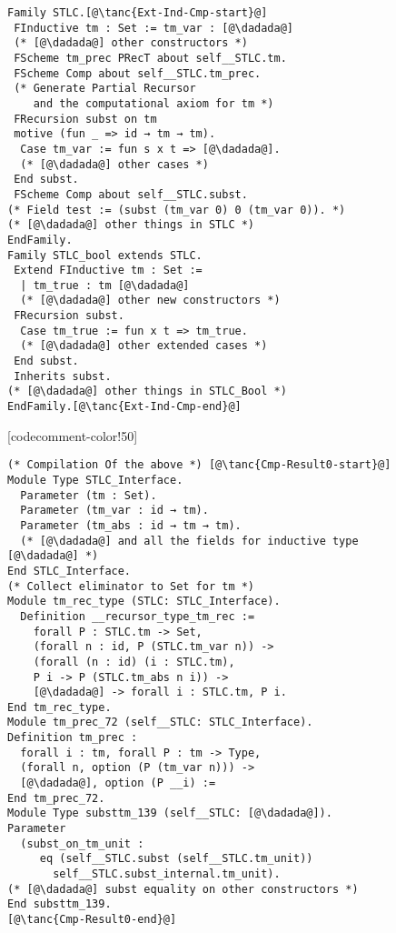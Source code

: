 \begin{figure}

\begin{minipage}{\textwidth}
\begin{multicols}{2}


\begin{lstlisting}
Family STLC.[@\tanc{Ext-Ind-Cmp-start}@]
 FInductive tm : Set := tm_var : [@\dadada@]
 (* [@\dadada@] other constructors *) 
 FScheme tm_prec PRecT about self__STLC.tm.
 FScheme Comp about self__STLC.tm_prec.
 (* Generate Partial Recursor 
    and the computational axiom for tm *)
 FRecursion subst on tm 
 motive (fun _ => id → tm → tm). 
  Case tm_var := fun s x t => [@\dadada@].
  (* [@\dadada@] other cases *)
 End subst.
 FScheme Comp about self__STLC.subst.
(* Field test := (subst (tm_var 0) 0 (tm_var 0)). *)
(* [@\dadada@] other things in STLC *)
EndFamily.
Family STLC_bool extends STLC.
 Extend FInductive tm : Set :=
  | tm_true : tm [@\dadada@]
  (* [@\dadada@] other new constructors *)
 FRecursion subst.
  Case tm_true := fun x t => tm_true.
  (* [@\dadada@] other extended cases *)
 End subst. 
 Inherits subst.
(* [@\dadada@] other things in STLC_Bool *)
EndFamily.[@\tanc{Ext-Ind-Cmp-end}@]
\end{lstlisting}

[codecomment-color!50]



\begin{lstlisting}
(* Compilation Of the above *) [@\tanc{Cmp-Result0-start}@]
Module Type STLC_Interface. 
  Parameter (tm : Set).
  Parameter (tm_var : id → tm).
  Parameter (tm_abs : id → tm → tm).
  (* [@\dadada@] and all the fields for inductive type [@\dadada@] *)
End STLC_Interface.
(* Collect eliminator to Set for tm *)
Module tm_rec_type (STLC: STLC_Interface).
  Definition __recursor_type_tm_rec :=
    forall P : STLC.tm -> Set,
    (forall n : id, P (STLC.tm_var n)) ->
    (forall (n : id) (i : STLC.tm),
    P i -> P (STLC.tm_abs n i)) ->
    [@\dadada@] -> forall i : STLC.tm, P i.
End tm_rec_type.  
Module tm_prec_72 (self__STLC: STLC_Interface).
Definition tm_prec :
  forall i : tm, forall P : tm -> Type,
  (forall n, option (P (tm_var n))) ->
  [@\dadada@], option (P __i) :=
End tm_prec_72. 
Module Type substtm_139 (self__STLC: [@\dadada@]).
Parameter
  (subst_on_tm_unit :
	 eq (self__STLC.subst (self__STLC.tm_unit))
       self__STLC.subst_internal.tm_unit).
(* [@\dadada@] subst equality on other constructors *)
End substtm_139. 
[@\tanc{Cmp-Result0-end}@]
\end{lstlisting}


\end{multicols}
\end{minipage}
\end{figure}
